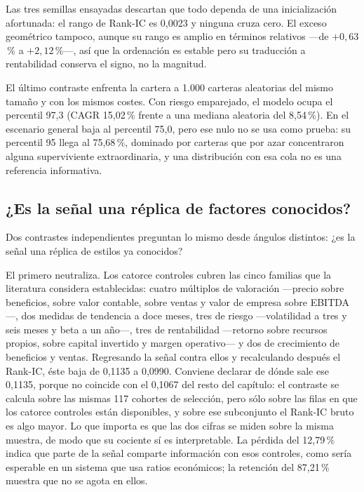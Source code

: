 Las tres semillas ensayadas descartan que todo dependa de una inicialización afortunada: el rango de
Rank-IC es 0,0023 y ninguna cruza cero. El exceso geométrico tampoco, aunque su rango es amplio en
términos relativos ---de $+0{,}63$\,\% a $+2{,}12$\,\%---, así que la ordenación es estable pero su
traducción a rentabilidad conserva el signo, no la magnitud.

El último contraste enfrenta la cartera a 1.000 carteras aleatorias del mismo tamaño y con los
mismos costes. Con riesgo emparejado, el modelo ocupa el percentil 97,3 (CAGR 15,02\,\% frente a una
mediana aleatoria del 8,54\,\%). En el escenario general baja al percentil 75,0, pero ese nulo no se
usa como prueba: su percentil 95 llega al 75,68\,\%, dominado por carteras que por azar concentraron
alguna superviviente extraordinaria, y una distribución con esa cola no es una referencia
informativa.

\subsection{¿Es la señal una réplica de factores conocidos?}
\label{sec:replica-factores}

Dos contrastes independientes preguntan lo mismo desde ángulos distintos: ¿es la señal una réplica
de estilos ya conocidos?

El primero neutraliza. Los catorce controles cubren las cinco familias que la literatura considera
establecidas: cuatro múltiplos de valoración ---precio sobre beneficios, sobre valor contable, sobre
ventas y valor de empresa sobre EBITDA---, dos medidas de tendencia a doce meses, tres de riesgo
---volatilidad a tres y seis meses y beta a un año---, tres de rentabilidad ---retorno sobre
recursos propios, sobre capital invertido y margen operativo--- y dos de crecimiento de beneficios y
ventas. Regresando la señal contra ellos y recalculando después el Rank-IC, éste baja de 0,1135 a
0,0990. Conviene declarar de dónde sale ese 0,1135, porque
no coincide con el 0,1067 del resto del capítulo: el contraste se calcula sobre las mismas 117
cohortes de selección, pero sólo sobre las filas en que los catorce controles están disponibles, y
sobre ese subconjunto el Rank-IC bruto es algo mayor. Lo que importa es que las dos cifras se miden
sobre la misma muestra, de modo que su cociente sí es interpretable. La pérdida del 12,79\,\% indica
que parte de la señal comparte información con esos controles, como sería esperable en un sistema
que usa ratios económicos; la retención del 87,21\,\% muestra que no se agota en ellos.


